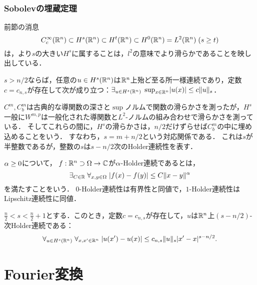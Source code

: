 \documentclass[uplatex,dvipdfmx]{jsreport}
\begin{document}
\subsection{Sobolevの埋蔵定理}

\begin{tcolorbox}[colframe=ForestGreen, colback=ForestGreen!10!white,breakable,colbacktitle=ForestGreen!40!white,coltitle=black,fonttitle=\bfseries\sffamily,
title=]
    前節の消息
    \[C_c^\infty(\mathbb{R}^n)\subset H^s(\mathbb{R}^n)\subset H^{t}(\mathbb{R}^n)\subset H^0(\mathbb{R}^n)=L^2(\mathbb{R}^n)\;(s\ge t)\]
    は，より$s$の大きい$H^s$に属することは，$l^2$の意味でより滑らかであることを映し出している．
\end{tcolorbox}

\begin{theorem}
    $s>n/2$ならば，任意の$u\in H^s(\mathbb{R}^n)$は$\mathbb{R}^n$上殆ど至る所一様連続であり，定数$c=c_{n,s}$が存在して次が成り立つ：$\exists_{u\in H^s(\mathbb{R}^n)}\;\sup_{x\in\mathbb{R}^n}\lvert u(x)\rvert\le c\|u\|_s$．
\end{theorem}
\begin{remarks}
    $C^m,C_b^m$は古典的な導関数の深さと$\sup$ノルムで関数の滑らかさを測ったが，$H^s$一般に$W^{m,p}$は一般化された導関数と$L^2$-ノルムの組み合わせで滑らかさを測っている．
    そしてこれらの間に，$H^s$の滑らかさは，$n/2$だけずらせば$C_b^m$の中に埋め込めることをいう．
    すなわち，$s=m+n/2$という対応関係である．
    これは$s$が半整数であるが，整数の$s$は$s-n/2$次のHolder連続性を表す．
\end{remarks}

\begin{definition}
    $\alpha\ge0$について，
    $f:\mathbb{R}^n\supset\Omega\to\mathbb{C}$が$\alpha$-Holder連続であるとは，
    \[\exists_{C\in\mathbb{R}}\;\forall_{x,y\in\Omega}\;\lvert f(x)-f(y)\rvert\le C\|x-y\|^\alpha\]
    を満たすことをいう．
    $0$-Holder連続性は有界性と同値で，$1$-Holder連続性はLipschitz連続性に同値．
\end{definition}

\begin{theorem}
    $\frac{n}{2}<s<\frac{n}{2}+1$とする．このとき，定数$c=c_{n,s}$が存在して，$u$は$\mathbb{R}^n$上$(s-n/2)$-次Holder連続である：
    \[\forall_{u\in H^s(\mathbb{R}^n)}\;\forall_{x,x'\in\mathbb{R}^n}\;\lvert u(x')-u(x)\rvert\le c_{n,s}\|u\|_s\lvert x'-x\rvert^{s-n/2}.\]
\end{theorem}

\chapter{Fourier変換}
\end{document}
